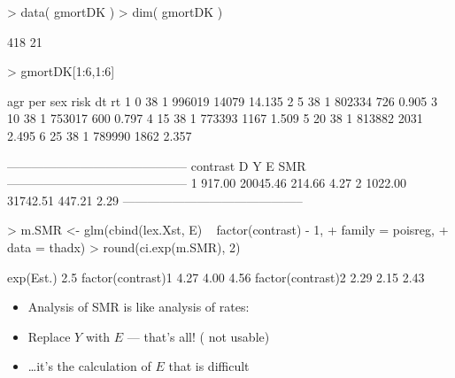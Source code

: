 \begin{frame}[fragile]
\begin{Schunk}
\begin{Sinput}
> data( gmortDK )
> dim( gmortDK )
\end{Sinput}
\begin{Soutput}
[1] 418  21
\end{Soutput}
\begin{Sinput}
> gmortDK[1:6,1:6]
\end{Sinput}
\begin{Soutput}
  agr per sex   risk    dt     rt
1   0  38   1 996019 14079 14.135
2   5  38   1 802334   726  0.905
3  10  38   1 753017   600  0.797
4  15  38   1 773393  1167  1.509
5  20  38   1 813882  2031  2.495
6  25  38   1 789990  1862  2.357
\end{Soutput}
\end{Schunk}
\end{frame}

\begin{frame}[fragile]
\begin{Schunk}
\begin{Soutput}
 -------------------------------------------- 
 contrast         D        Y       E     SMR  
 -------------------------------------------- 
 1           917.00 20045.46  214.66    4.27  
 2          1022.00 31742.51  447.21    2.29  
 -------------------------------------------- 
\end{Soutput}
\end{Schunk}
\vspace*{-1em}
\begin{Schunk}
\begin{Sinput}
> m.SMR <- glm(cbind(lex.Xst, E) ~ factor(contrast) - 1,
+              family = poisreg,
+                data = thadx)
> round(ci.exp(m.SMR), 2)
\end{Sinput}
\begin{Soutput}
                  exp(Est.) 2.5%
factor(contrast)1      4.27 4.00  4.56
factor(contrast)2      2.29 2.15  2.43
\end{Soutput}
\end{Schunk}
\pause
\begin{itemize}[<+->]
\item Analysis of SMR is like analysis of rates:
\item Replace $Y$ with $E$ --- that's all! ( not usable)
\item \ldots it's the calculation of $E$ that is difficult
\end{itemize}
\end{frame}
